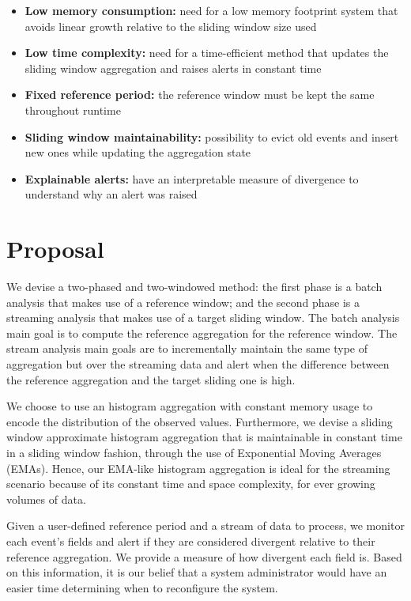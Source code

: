 \begin{itemize}
    \item \textbf{Low memory consumption:} need for a low memory footprint system that avoids linear growth relative to the sliding window size used
    
    \item \textbf{Low time complexity:} need for a time-efficient method that updates the sliding window aggregation and raises alerts in constant time
    
    \item \textbf{Fixed reference period:} the reference window must be kept the same throughout runtime
    
    \item \textbf{Sliding window maintainability:} possibility to evict old events and insert new ones while updating the aggregation state
    
    \item \textbf{Explainable alerts:} have an interpretable measure of divergence to understand why an alert was raised
\end{itemize}


\section{Proposal}
We devise a two-phased and two-windowed method: the first phase is a batch analysis that makes use of a reference window; and the second phase is a streaming analysis that makes use of a target sliding window. The batch analysis main goal is to compute the reference aggregation for the reference window. The stream analysis main goals are to incrementally maintain the same type of aggregation but over the streaming data and alert when the difference between the reference aggregation and the target sliding one is high.

We choose to use an histogram aggregation with constant memory usage to encode the distribution of the observed values. Furthermore, we devise a sliding window approximate histogram aggregation that is maintainable in constant time in a sliding window fashion, through the use of Exponential Moving Averages (EMAs). Hence, our EMA-like histogram aggregation is ideal for the streaming scenario because of its constant time and space complexity, for ever growing volumes of data.

Given a user-defined reference period and a stream of data to process, we monitor each event's fields and alert if they are considered divergent relative to their reference aggregation. We provide a measure of how divergent each field is. Based on this information, it is our belief that a system administrator would have an easier time determining when to reconfigure the system.

